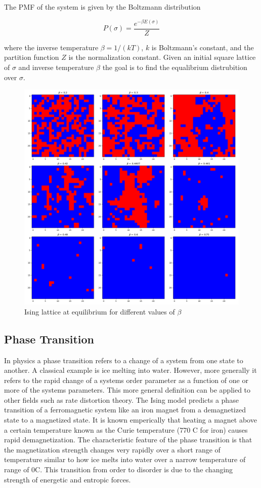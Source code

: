 \documentclass{article}
\begin{document}
The PMF of the system is given by the Boltzmann distribution

\begin{equation}
    P(\sigma) = \frac{e^{-\beta E(\sigma)}}{Z}
\end{equation}

where the inverse temperature $\beta = 1/(kT)$, $k$ is Boltzmann's constant, and the partition function $Z$ is the normalization constant.
Given an initial square lattice of $\sigma$ and inverse temperature $\beta$ the goal is to find the equalibrium distrubition over $\sigma$.

\begin{figure}[ht]
    \centering
    \includegraphics[scale = 0.39]{diagrams/multiple_lattices.png}
    \caption{Ising lattice at equilibrium for different values of $\beta$}
    \label{fig:6}
\end{figure}

\subsection{Phase Transition}
In physics a phase transition refers to a change of a system from one state to another. A classical example is ice melting into water.
However, more generally it refers to the rapid change of a systems order parameter as a function of one or more of the systems parameters. 
This more general definition can be applied to other fields such as rate distortion theory. The Ising model predicts a phase transition of a ferromagnetic system like an iron magnet from a demagnetized state to a magnetized state. 
It is known emperically that heating a magnet above a certain temperature known as the Curie temperature (770 \degree C for iron) causes rapid
demagnetization. The characteristic feature of the phase transition is that the magnetization strength changes very rapidly over a short range of temperature
similar to how ice melts into water over a narrow temperature of range of 0\degree C. This transition from order to disorder is due to the changing strength of
energetic and entropic forces.
\end{document}
